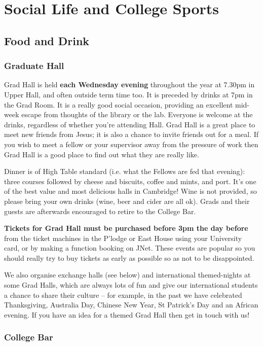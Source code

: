 \documentclass[11pt,fleqn, oneside]{book} %
\begin{document}
\chapter{Social Life and College Sports}
\section{Food and Drink}
\subsection{Graduate Hall}

Grad Hall is held \textbf{each Wednesday evening} throughout the year at 7.30pm in Upper Hall, and often outside term time too. It is preceded by drinks at 7pm in the Grad Room. It is a really good social occasion, providing an excellent mid-week escape from thoughts of the library or the lab. Everyone is welcome at the drinks, regardless of whether you’re attending Hall. Grad Hall is a great place to meet new friends from Jesus; it is also a chance to invite friends out for a meal. If you wish to meet a fellow or your supervisor away from the pressure of work then Grad Hall is a good place to find out what they are really like. 

Dinner is of High Table standard (i.e. what the Fellows are fed that evening): three courses followed by cheese and biscuits, coffee and mints, and port. It’s one of the best value and most delicious halls in Cambridge!  Wine is not provided, so please bring your own drinks (wine, beer and cider are all ok). Grads and their guests are afterwards encouraged to retire to the College Bar. 

\textbf{Tickets for Grad Hall must be purchased before 3pm the day before} from the ticket machines in the P’lodge or East House using your University card, or by making a function booking on JNet. These events are popular so you should really try to buy tickets as early as possible so as not to be disappointed.

We also organise exchange halls (see below) and international themed-nights at some Grad Halls, which are always lots of fun and give our international students a chance to share their culture – for example, in the past we have celebrated Thanksgiving, Australia Day, Chinese New Year, St Patrick’s Day and an African evening. If you have an idea for a themed Grad Hall then get in touch with us!

\subsection{College Bar}
\end{document}
